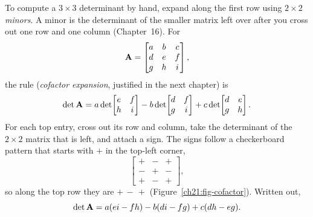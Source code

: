 To compute a $3\times 3$ determinant by hand, expand along the first row using
$2\times 2$ \emph{minors}. A minor is the determinant of the smaller matrix left
over after you cross out one row and one column (Chapter~16). For
\[
  \mathbf{A} = \begin{bmatrix} a & b & c \\ d & e & f \\ g & h & i \end{bmatrix},
\]
the rule (\emph{cofactor expansion}, justified in the next
chapter) is
\[
  \det\mathbf{A}
  = a\det\!\begin{bmatrix} e & f \\ h & i \end{bmatrix}
  - b\det\!\begin{bmatrix} d & f \\ g & i \end{bmatrix}
  + c\det\!\begin{bmatrix} d & e \\ g & h \end{bmatrix}.
\]
For each top entry, cross out its row and column, take the determinant of the
$2\times 2$ matrix that is left, and attach a sign. The signs follow a
checkerboard pattern that starts with $+$ in the top-left corner,
\[
  \begin{bmatrix} + & - & + \\ - & + & - \\ + & - & + \end{bmatrix},
\]
so along the top row they are $+\,-\,+$ (Figure~\ref{ch21:fig-cofactor}).
Written out,
\[
  \det\mathbf{A} = a(ei - fh) - b(di - fg) + c(dh - eg).
\]

